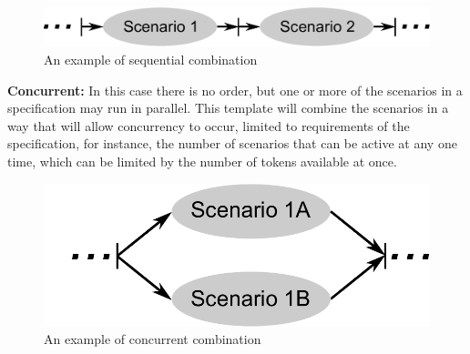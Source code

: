 \documentclass[british,compsoc]{IEEEtran}
\begin{document}
\begin{figure}[h]
\begin{centering}
\includegraphics[scale=0.45]{Images/sequential_combination}
\par\end{centering}

\begin{centering}
\protect\caption{\label{fig:sequential_combination}An example of sequential combination}

\par\end{centering}

\end{figure}

\textbf{Concurrent:} In this case there is no order, but one or more
of the scenarios in a specification may run in parallel. This template
will combine the scenarios in a way that will allow concurrency to
occur, limited to requirements of the specification, for instance,
the number of scenarios that can be active at any one time, which
can be limited by the number of tokens available at once.

\begin{figure}[h]
\begin{centering}
\includegraphics[scale=0.45]{Images/concurrent_combination}
\par\end{centering}

\begin{centering}
\protect\caption{\label{fig:concurrent_combination}An example of concurrent combination}

\par\end{centering}

\end{figure}
\end{document}
